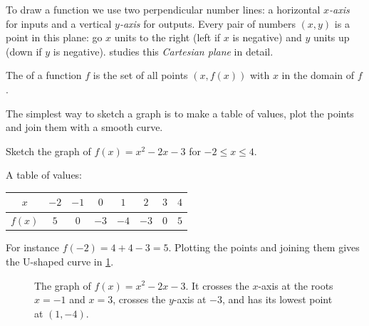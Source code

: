 To draw a function we use two perpendicular number lines: a horizontal
\emph{$x$-axis} for inputs and a vertical \emph{$y$-axis} for outputs. Every
pair of numbers $(x, y)$ is a point in this plane: go $x$ units to the right
(left if $x$ is negative) and $y$ units up (down if $y$ is negative).
 studies this \emph{Cartesian plane} in detail.

\begin{definition}[Graph]\label{def:graph}
The  of a function $f$ is the set of all points $(x, f(x))$ with
$x$ in the domain of $f$.
\end{definition}

The simplest way to sketch a graph is to make a table of values, plot the
points and join them with a smooth curve.

\begin{example}\label{ex:plot-quadratic}
Sketch the graph of $f(x) = x^2 - 2x - 3$ for $-2 \le x \le 4$.

\sol A table of values:
\begin{center}
\begin{tabular}{c|ccccccc}
$x$ & $-2$ & $-1$ & $0$ & $1$ & $2$ & $3$ & $4$\\
\hline
$f(x)$ & $5$ & $0$ & $-3$ & $-4$ & $-3$ & $0$ & $5$
\end{tabular}
\end{center}
For instance $f(-2) = 4 + 4 - 3 = 5$. Plotting the points and joining them
gives the U-shaped curve in \cref{fig:quadratic-plot}.
\end{example}

\begin{figure}[htbp]
\centering
{}
\caption{The graph of $f(x) = x^2 - 2x - 3$. It crosses the $x$-axis at the
  roots $x = -1$ and $x = 3$, crosses the $y$-axis at $-3$, and has its lowest
  point at $(1, -4)$.}
\label{fig:quadratic-plot}
\end{figure}

